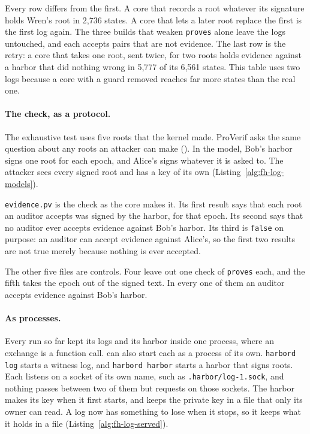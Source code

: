 
Every row differs from the first. A core that records a root whatever its
signature holds Wren's root in 2,736 states. A core that lets a later root
replace the first is the first log again. The three builds that weaken
\texttt{proves} alone leave the logs untouched, and each accepts pairs
that are not evidence. The last row is the retry: a core that takes one
root, sent twice, for two roots holds evidence against a harbor that did
nothing wrong in 5,777 of its 6,561 states. This table uses two logs
because a core with a guard removed reaches far more states than the
real one.

\paragraph{The check, as a protocol.}
The exhaustive test uses five roots that the kernel made. ProVerif asks
the same question about any roots an attacker can make
(). In the model, Bob's harbor signs
one root for each epoch, and Alice's signs whatever it is asked to. The
attacker sees
every signed root and has a key of its own
(Listing~\ref{alg:fh-log-models}).


\texttt{evidence.pv} is the check as the core makes it. Its first result
says that each root an auditor accepts was signed by the harbor, for that
epoch. Its second says that no auditor ever accepts evidence against
Bob's harbor. Its third is \texttt{false} on purpose: an auditor can
accept evidence against Alice's, so the first two results are not true
merely because nothing is ever accepted.

The other five files are controls. Four leave out one check of
\texttt{proves} each, and the fifth takes the epoch out of the signed
text. In every one of them an auditor accepts evidence against Bob's
harbor.

\paragraph{As processes.}
Every run so far kept its logs and its harbor inside one process, where
an exchange is a function call. \pdkernelname{} can also start each as a
process of its own. \texttt{harbord log} starts a witness log, and
\texttt{harbord harbor} starts a harbor that signs roots. Each listens on
a socket of its own name, such as \texttt{.harbor/log-1.sock}, and
nothing passes between two of them but requests on those sockets. The harbor makes its key when it first starts,
and keeps the private key in a file that only its owner can read. A log
now has something to lose when it stops, so it keeps what it holds in a
file (Listing~\ref{alg:fh-log-served}).

